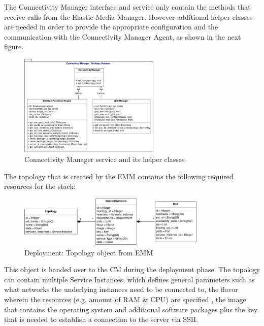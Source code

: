 The Connectivity Manager interface and service only contain the methods that receive calls from the Elastic Media Manager. However additional helper classes are needed in order to provide the appropriate configuration and the communication with the Connectivity Manager Agent, as shown in the next figure.

\begin{figure}[H]
\centering

\includegraphics[width=0.6\textwidth]{images/design/cm_class_diagram}

\caption{Connectivity Manager service and its helper classes}
\end{figure}

The topology that is created by the EMM contains the following required resources for the stack:

\begin{figure}[H]
\centering

\includegraphics[width=0.8\textwidth]{images/design/cm_topology_object}

\caption{Deployment: Topology object from EMM}
\end{figure}

This object is handed over to the CM during the deployment phase. The topology can contain multiple Service Instances, which defines general parameters such as what networks the underlying instances need to be connected to, the flavor wherein the resources (e.g. amount of RAM \& CPU) are specified \cite{openstack-admin}, the image that contains the operating system and additional software packages plus the key that is needed to establish a connection to the server via SSH.

